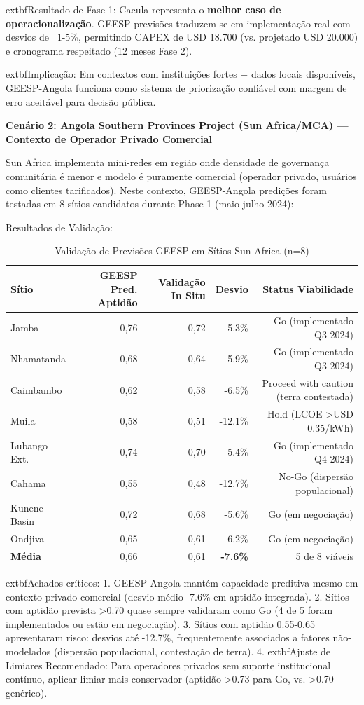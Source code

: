 \documentclass[12pt, a4paper]{article}
\begin{document}
{{{{{{{{{{{{	extbf{Resultado de Fase 1}: Cacula representa o \textbf{melhor caso de operacionalização}. GEESP previsões traduzem-se em implementação real com desvios de ~1-5\%, permitindo CAPEX de USD 18.700 (vs. projetado USD 20.000) e cronograma respeitado (12 meses Fase 2).

	extbf{Implicação}: Em contextos com instituições fortes + dados locais disponíveis, GEESP-Angola funciona como sistema de priorização confiável com margem de erro aceitável para decisão pública.

\textbf{Cenário 2: Angola Southern Provinces Project (Sun Africa/MCA) — Contexto de Operador Privado Comercial}

Sun Africa implementa mini-redes em região onde densidade de governança comunitária é menor e modelo é puramente comercial (operador privado, usuários como clientes tarificados). Neste contexto, GEESP-Angola predições foram testadas em 8 sítios candidatos durante Phase 1 (maio-julho 2024):

Resultados de Validação:
\begin{table}[H]
\centering
\caption{Validação de Previsões GEESP em Sítios Sun Africa (n=8)}
\label{tab:geesp_validation_sun}
\footnotesize
\begin{tabular}{|l|r|r|r|r|}
\hline
\textbf{Sítio} & \textbf{GEESP Pred. Aptidão} & \textbf{Validação In Situ} & \textbf{Desvio} & \textbf{Status Viabilidade} \\
\hline
Jamba & 0,76 & 0,72 & -5.3\% & Go (implementado Q3 2024) \\
Nhamatanda & 0,68 & 0,64 & -5.9\% & Go (implementado Q3 2024) \\
Caimbambo & 0,62 & 0,58 & -6.5\% & Proceed with caution (terra contestada) \\
Muila & 0,58 & 0,51 & -12.1\% & Hold (LCOE >USD 0.35/kWh) \\
Lubango Ext. & 0,74 & 0,70 & -5.4\% & Go (implementado Q4 2024)\\
Cahama & 0,55 & 0,48 & -12.7\% & No-Go (dispersão populacional) \\
Kunene Basin & 0,72 & 0,68 & -5.6\% & Go (em negociação) \\
Ondjiva & 0,65 & 0,61 & -6.2\% & Go (em negociação) \\
\hline
\textbf{Média} & 0,66 & 0,61 & \textbf{-7.6\%} & 5 de 8 viáveis \\
\hline
\end{tabular}
\end{table}

	extbf{Achados críticos}:
1. GEESP-Angola mantém capacidade preditiva mesmo em contexto privado-comercial (desvio médio -7.6\% em aptidão integrada).
2. Sítios com aptidão prevista >0.70 quase sempre validaram como Go (4 de 5 foram implementados ou estão em negociação).
3. Sítios com aptidão 0.55-0.65 apresentaram risco: desvios até -12.7\%, frequentemente associados a fatores não-modelados (dispersão populacional, contestação de terra).
4. 	extbf{Ajuste de Limiares Recomendado}: Para operadores privados sem suporte institucional contínuo, aplicar limiar mais conservador (aptidão >0.73 para Go, vs. >0.70 genérico).

}}}}}}}}}}}}
\end{document}

